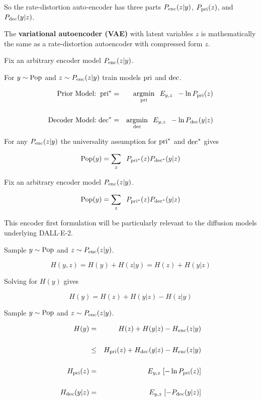 {\vfill
So the rate-distortion auto-encoder has three parts $P_{\mathrm{enc}}(z|y)$, $P_{\mathrm{pri}}(z)$, and $P_{\mathrm{dec}}(y|z)$.

\vfill
The {\bf variational autoencoder (VAE)} with latent variables $z$ is mathematically the same as a rate-distortion autoencoder
with compressed form $z$.



Fix an arbitrary encoder model $P_{\mathrm{enc}}(z|y)$.

\vfill
For $y \sim \mathrm{Pop}$ and $z \sim P_{\mathrm{enc}}(z|y)$ train models $\mathrm{pri}$ and $\mathrm{dec}$.

\begin{eqnarray*}
\mbox{Prior Model:}\;\;\mathrm{pri}^* & = & \operatorname*{argmin}_{\mathrm{pri}} \;\; E_{y,z}\;\;-\ln P_{\mathrm{pri}}(z) \\
\\
\mbox{Decoder Model:}\;\mathrm{dec}^* & = & \operatorname*{argmin}_{\mathrm{dec}}\;\; E_{y,z}\;\;-\ln P_{\mathrm{dec}}(y|z)
\end{eqnarray*}

\vfill
For any $P_{\mathrm{enc}}(z|y)$ the universality assumption for $\mathrm{pri}^*$ and $\mathrm{dec}^*$ gives

\vfill
$$\mathrm{Pop}(y) = \sum_z\;\;P_{\mathrm{pri}^*}(z)P_{\mathrm{dec}^*}(y|z)$$


Fix an arbitrary encoder model $P_{\mathrm{enc}}(z|y)$.

\vfill
$$\mathrm{Pop}(y) = \sum_z\;\;P_{\mathrm{pri}^*}(z)P_{\mathrm{dec}^*}(y|z)$$

\vfill
This encoder first formulation will be particularly relevant to the diffusion models underlying DALL$\cdot$E-2.


Sample $y \sim \mathrm{Pop}$ and $z \sim P_{\mathrm{enc}}(z|y)$.

\vfill
$$H(y,z) = H(y) + H(z|y) = H(z) + H(y|z)$$

\vfill
Solving for $H(y)$ gives

$$H(y) = H(z) + H(y|z) - H(z|y)$$

Sample $y \sim \mathrm{Pop}$ and $z \sim P_{\mathrm{enc}}(z|y)$.

\vfill
\begin{eqnarray*}
H(y) & = & H(z) + H(y|z) - H_{\mathrm{enc}}(z|y) \\
\\
 & \leq & H_{\mathrm{pri}}(z) + H_{\mathrm{dec}}(y|z) - H_{\mathrm{enc}}(z|y) \\
 \\
H_{\mathrm{pri}}(z) & = & E_{y,z}\;[-\ln P_{\mathrm{pri}}(z)] \\
\\
H_{\mathrm{dec}}(y|z) & = & E_{y,z}\;[- P_{\mathrm{dec}}(y|z)]
\end{eqnarray*}

}
